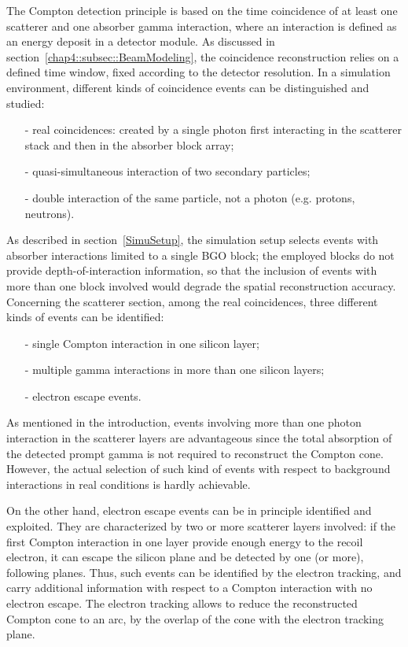 The Compton detection principle is based on the time coincidence of at least one scatterer and one absorber gamma interaction, where an interaction is defined as an energy deposit in a detector module. As discussed in section~\ref{chap4::subsec::BeamModeling}, the coincidence reconstruction relies on a defined time window, fixed according to the detector resolution. In a simulation environment, different kinds of coincidence events can be distinguished and studied: 
\begin{itemize}
\item[-] real coincidences: created by a single photon first interacting in the scatterer stack and then in the absorber block array;
\item[-] quasi-simultaneous interaction of two secondary particles;
\item[-] double interaction of the same particle, not a photon (e.g. protons, neutrons).
\end{itemize}
As described in section~\ref{SimuSetup}, the simulation setup selects events with absorber interactions limited to a single BGO block; the employed blocks do not provide depth-of-interaction information, so that the inclusion of events with more than one block involved would degrade the spatial reconstruction accuracy.
Concerning the scatterer section, among the real coincidences, three different kinds of events can be identified:
\begin{itemize}
\item[-] single Compton interaction in one silicon layer;
\item[-] multiple gamma interactions in more than one silicon layers;
\item[-] electron escape events.
\end{itemize}
As mentioned in the introduction, events involving more than one photon interaction in the scatterer layers are advantageous since the total absorption of the detected prompt gamma is not required to reconstruct the Compton cone. However, the actual selection of such kind of events with respect to background interactions in real conditions is hardly achievable.

On the other hand, electron escape events can be in principle identified and exploited. They are characterized by two or more scatterer layers involved: if the first Compton interaction in one layer provide enough energy to the recoil electron, it can escape the silicon plane and be detected by one (or more), following planes. Thus, such events can be identified by the electron tracking, and carry additional information with respect to a Compton interaction with no electron escape. The electron tracking allows to reduce the reconstructed Compton cone to an arc, by the overlap of the cone with the electron tracking plane.      

